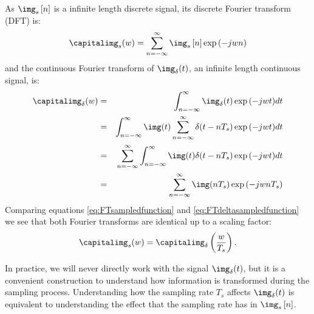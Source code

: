 As $\img_s  \left[n \right]$ is a infinite length discrete signal, its discrete Fourier transform (DFT) is:
\begin{equation}
    \capitalimg_s(w) = \sum_{n=-\infty}^{\infty} \img_s  \left[n \right] \exp{(-jwn)}
    \label{eq:FTsampledfunction}
\end{equation}
and the continuous Fourier transform of $\img_{\delta} (t)$, an infinite length continuous signal, is: 
\begin{eqnarray}
    \capitalimg_{\delta} (w) &=& \int_{n=-\infty}^{\infty} \img_{\delta} (t) \exp{(-jwt)} dt \\
    & = & \int_{n=-\infty}^{\infty} \img(t) \sum_{n=-\infty}^{\infty} \delta(t-n T_s) \exp{(-jwt)} dt \\
    & = & \sum_{n=-\infty}^{\infty} \int_{n=-\infty}^{\infty} \img(t) \delta(t-n T_s) \exp{(-jwt)} dt \\
    & = & \sum_{n=-\infty}^{\infty} \img(n T_s) \exp{(-j w n T_s)}
    \label{eq:FTdeltasampledfunction}
\end{eqnarray}
Comparing equations \ref{eq:FTsampledfunction} and \ref{eq:FTdeltasampledfunction} we see that both Fourier transforms are identical up to a scaling factor: 
\begin{equation}
\capitalimg_s(w) = \capitalimg_{\delta} \left( \frac{w}{T_s} \right).
\end{equation}

In practice, we will never directly work with the signal $\img_{\delta} (t)$, but it is a convenient construction to understand how information is transformed during the sampling process. Understanding how the sampling rate $T_s$ affects $\img_{\delta} (t)$ is equivalent to  understanding the effect that the sampling rate has in $\img_s  \left[n \right]$.





